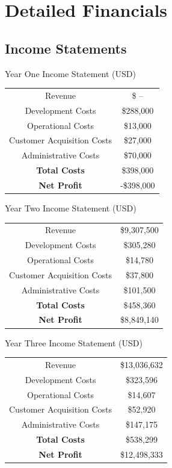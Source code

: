 \documentclass[12pt]{article}
\begin{document}
\section{Detailed Financials}
\subsection{Income Statements}
\vspace{1.5cm}
\begin{center}
	Year One Income Statement (USD) \\[1.5ex]
	
	\begin{tabular}{c | c}
	Revenue & \$ -- \\
	Development Costs & \$288,000 \\
	Operational Costs & \$13,000 \\
	Customer Acquisition Costs & \$27,000 \\
	Administrative Costs & \$70,000 \\
	\textbf{Total Costs} & \$398,000 \\
	\textbf{Net Profit} & -\$398,000
	\end{tabular}
\end{center}
\vspace{1.5cm}
\begin{center}
	Year Two Income Statement (USD) \\[1.5ex]
	
	\begin{tabular}{c | c}
	Revenue & \$9,307,500  \\
	Development Costs & \$305,280 \\
	Operational Costs & \$14,780 \\
	Customer Acquisition Costs & \$37,800 \\
	Administrative Costs & \$101,500 \\
	\textbf{Total Costs} & \$458,360 \\
	\textbf{Net Profit} & \$8,849,140
	\end{tabular}
\end{center}
\vspace{1.5cm}
\pagebreak
\begin{center}
	Year Three Income Statement (USD) \\[1.5ex]
	
	\begin{tabular}{c | c}
	Revenue & \$13,036,632 \\
	Development Costs & \$323,596 \\
	Operational Costs & \$14,607 \\
	Customer Acquisition Costs & \$52,920 \\
	Administrative Costs & \$147,175 \\
	\textbf{Total Costs} & \$538,299 \\
	\textbf{Net Profit} & \$12,498,333
	\end{tabular}
\end{center}
\end{document}

